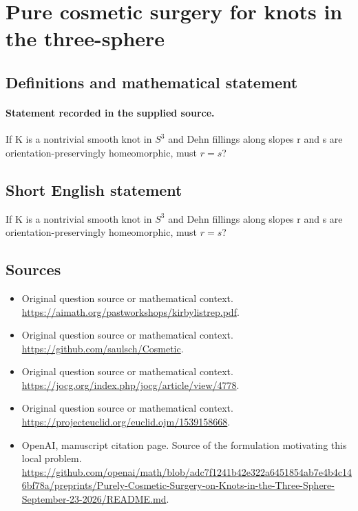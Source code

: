 \documentclass[11pt]{article}
\begin{document}
\section*{Pure cosmetic surgery for knots in the three-sphere}\label{statement}
\subsection{Definitions and mathematical statement}
\paragraph{Statement recorded in the supplied source.}
If K is a nontrivial smooth knot in $S^{3}$ and Dehn fillings along slopes r and s are orientation-preservingly homeomorphic, must $r=s$?
\subsection{Short English statement}
If K is a nontrivial smooth knot in $S^{3}$ and Dehn fillings along slopes r and s are orientation-preservingly homeomorphic, must $r=s$?
\subsection{Sources}
\begin{itemize}
\item[S1] Original question source or mathematical context.
\url{https://aimath.org/pastworkshops/kirbylistrep.pdf}.
\item[S2] Original question source or mathematical context.
\url{https://github.com/saulsch/Cosmetic}.
\item[S3] Original question source or mathematical context.
\url{https://jocg.org/index.php/jocg/article/view/4778}.
\item[S4] Original question source or mathematical context.
\url{https://projecteuclid.org/euclid.ojm/1539158668}.
\item[S6] OpenAI, manuscript citation page. Source of the formulation motivating this local problem.
\url{https://github.com/openai/math/blob/adc7f1241b42e322a6451854ab7e4b4c146bf78a/preprints/Purely-Cosmetic-Surgery-on-Knots-in-the-Three-Sphere-September-23-2026/README.md}.
\end{itemize}
\end{document}
